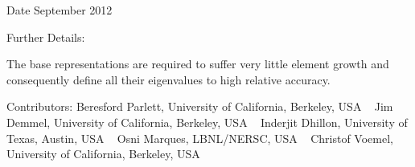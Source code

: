 \begin{DoxyDate}{Date}
September 2012 
\end{DoxyDate}
\begin{DoxyParagraph}{Further Details\+: }
\begin{DoxyVerb}  The base representations are required to suffer very little
  element growth and consequently define all their eigenvalues to
  high relative accuracy.\end{DoxyVerb}
 
\end{DoxyParagraph}
\begin{DoxyParagraph}{Contributors\+: }
Beresford Parlett, University of California, Berkeley, U\+S\+A ~\newline
 Jim Demmel, University of California, Berkeley, U\+S\+A ~\newline
 Inderjit Dhillon, University of Texas, Austin, U\+S\+A ~\newline
 Osni Marques, L\+B\+N\+L/\+N\+E\+R\+S\+C, U\+S\+A ~\newline
 Christof Voemel, University of California, Berkeley, U\+S\+A ~\newline

\end{DoxyParagraph}
\hypertarget{group__auxOTHERauxiliary_ga6fa2f60646088821e40fbe04a41aa7b1}{}
